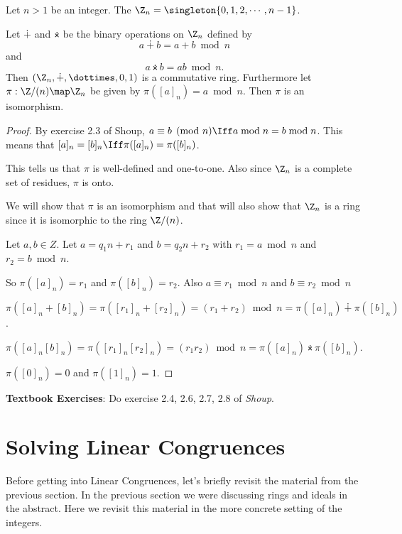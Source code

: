 \documentclass[oneside,12pt]{amsart}
\begin{document}
\begin{definition}
Let $n>1$ be an integer. The $\Z_n = \singleton{0,1,2,\cdots, n-1}$.
\end{definition}

\begin{lemma}
Let $\dotplus$ and $\dottimes$ be the binary operations on $\Z_n$ defined by
$$a\dotplus b = a+b \bmod n$$
and
$$a\dottimes b = ab \bmod n.$$
Then $\left(\Z_n,\dotplus,\dottimes,0,1\right)$ is a commutative ring. Furthermore
let ${\pi:\Z/(n) \map \Z_n}$ be given by ${\pi([a]_n) = a\bmod n}$. Then $\pi$ is an isomorphism.
\end{lemma}

\begin{proof}
By exercise 2.3 of Shoup, $a\equiv b \pmod{n} \Iff a\bmod n = b \bmod n$. This means that
$[a]_n = [b]_n \Iff \pi([a]_n) = \pi([b]_n)$.


This tells us that
$\pi$ is well-defined and one-to-one. Also since $\Z_n$ is a complete set of residues, $\pi$ is onto.


We will show that $\pi$ is an isomorphism and that will also show that $\Z_n$ is a ring since
it is isomorphic to the ring $\Z/(n)$.


Let $a,b\in Z$. Let $a=q_1n + r_1$ and $b=q_2n+r_2$ with $r_1 = a\bmod n$ and $r_2=b\bmod n$.

So $\pi([a]_n) = r_1$ and $\pi([b]_n) = r_2$. Also $a\equiv r_1 \bmod n$ and $b\equiv r_2 \bmod n$

\bigskip

$\pi([a]_n+[b]_n) = \pi([r_1]_n + [r_2]_n) = (r_1+r_2) \bmod n = \pi([a]_n) \dotplus \pi([b]_n)$.

\bigskip

$\pi([a]_n [b]_n) = \pi([r_1]_n  [r_2]_n) = (r_1 r_2) \bmod n = \pi([a]_n) \dottimes \pi([b]_n)$.

\bigskip

$\pi([0]_n) = 0$ and $\pi([1]_n)=1$.
\end{proof}

\textbf{Textbook Exercises}: Do exercise  2.4, 2.6, 2.7, 2.8 of \emph{Shoup}.

\newpage

\section{Solving Linear Congruences}

Before getting into Linear Congruences, let's briefly revisit the material from the previous section.
In the previous section we were discussing rings and ideals in the abstract. Here we revisit this
material in the more concrete setting of the integers.
\end{document}
